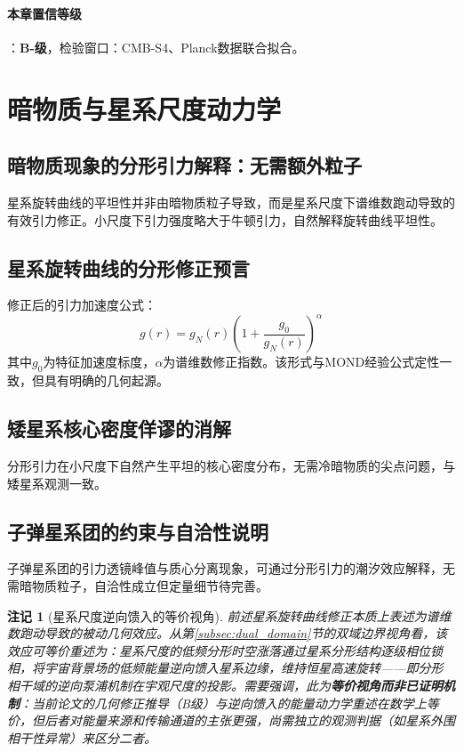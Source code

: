 \documentclass[12pt,a4paper,twocolumn]{article}
\newtheorem{remark}[theorem]{注记}
\begin{document}
\paragraph{本章置信等级}：\textbf{B-级}，检验窗口：CMB-S4、Planck数据联合拟合。

\section{暗物质与星系尺度动力学}

\subsection{暗物质现象的分形引力解释：无需额外粒子}
星系旋转曲线的平坦性并非由暗物质粒子导致，而是星系尺度下谱维数跑动导致的有效引力修正。小尺度下引力强度略大于牛顿引力，自然解释旋转曲线平坦性。

\subsection{星系旋转曲线的分形修正预言}
修正后的引力加速度公式：
\[
g(r) = g_N(r) \left( 1 + \frac{g_0}{g_N(r)} \right)^\alpha
\]
其中$g_0$为特征加速度标度，$\alpha$为谱维数修正指数。该形式与MOND经验公式定性一致，但具有明确的几何起源。

\subsection{矮星系核心密度佯谬的消解}
分形引力在小尺度下自然产生平坦的核心密度分布，无需冷暗物质的尖点问题，与矮星系观测一致。

\subsection{子弹星系团的约束与自洽性说明}
子弹星系团的引力透镜峰值与质心分离现象，可通过分形引力的潮汐效应解释，无需暗物质粒子，自洽性成立但定量细节待完善。

\begin{remark}[星系尺度逆向馈入的等价视角]
\label{rmk:dark_matter_reverse_feed}
前述星系旋转曲线修正本质上表述为谱维数跑动导致的被动几何效应。从第\ref{subsec:dual_domain}节的双域边界视角看，该效应可\emph{等价重述}为：星系尺度的低频分形时空涨落通过星系分形结构逐级相位锁相，将宇宙背景场的低频能量逆向馈入星系边缘，维持恒星高速旋转——即分形相干域的逆向泵浦机制在宇观尺度的投影。需要强调，此为\textbf{等价视角而非已证明机制}：当前论文的几何修正推导（B级）与逆向馈入的能量动力学重述在数学上等价，但后者对能量来源和传输通道的主张更强，尚需独立的观测判据（如星系外围相干性异常）来区分二者。
\end{remark}
\end{document}

